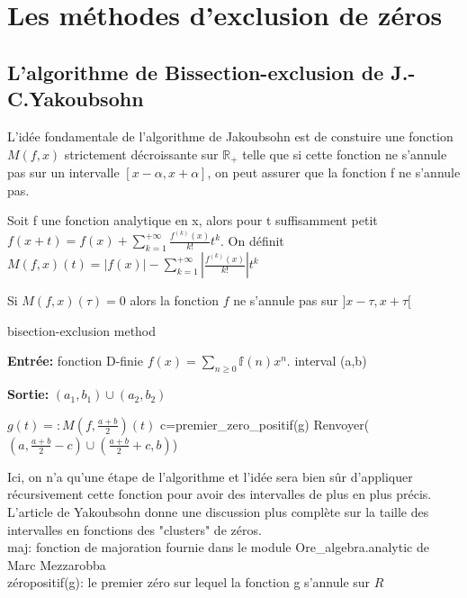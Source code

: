 \documentclass[a4paper,10.5pt]{article}
\begin{document}
	
	\newpage
	\section{Les méthodes d'exclusion de zéros}
	\subsection{L'algorithme de Bissection-exclusion de J.-C.Yakoubsohn}
	L'idée fondamentale de l'algorithme de Jakoubsohn est de constuire une fonction $M(f,x)$ strictement décroissante sur $\mathbb{R}_+$ telle que si cette fonction ne s'annule pas sur un intervalle $[x-\alpha,x+\alpha]$, on peut assurer que la fonction f ne s'annule pas.
	
	\begin{definition}Soit f une fonction analytique en x, alors pour t suffisamment petit\\ $f(x+t)=f(x)+\sum_{k=1}^{+\infty} \frac{f^{(k)}(x)}{k!}t^{k}$. On définit $M(f,x)(t)=|f(x)|-\sum_{k=1}^{+\infty}|\frac{f^{(k)}(x)}{k!}|t^{k}$
	\end{definition}
	
	\begin{proposition} Si $M(f,x)(\tau)=0$ alors la fonction $f$ ne s'annule pas sur $]x-\tau,x+\tau[$ 
	\end{proposition}

	\begin{algorithm}
		\caption{bisection-exclusion method}
		
		\vspace{2mm}
		
		\textbf{Entrée:} fonction D-finie $f(x)=\sum_{n \geq 0} \mathbb{f}(n)x^{n}$. interval (a,b)
		
		\textbf{Sortie:} $(a_{1},b_{1})\cup (a_{2},b_{2})$
		
		\begin{algorithmic}[1]
			
			\STATE $g(t)=:M(f,\frac{a+b}{2})(t)$
			\STATE c=premier\_zero\_positif(g)
			\STATE Renvoyer($(a,\frac{a+b}{2}-c)\cup (\frac{a+b}{2}+c,b)$)
		\end{algorithmic}
		
	\end{algorithm}
	
	\noindent Ici, on n'a qu'une étape de l'algorithme et l'idée sera bien sûr d'appliquer récursivement cette fonction pour avoir des intervalles de plus en plus précis. L'article de Yakoubsohn donne une discussion plus complète sur la taille des intervalles en fonctions des "clusters" de zéros.\\
	\noindent maj: fonction de majoration fournie dans le module Ore\_algebra.analytic de Marc Mezzarobba\\
	zéropositif(g): le premier zéro sur lequel la fonction g s'annule sur ${R}$
	\\
	
\end{document}
